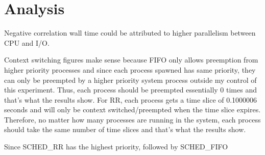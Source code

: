 ﻿\section{Analysis}

Negative correlation wall time could be attributed to higher parallelism between CPU and I/O.

Context switching figures make sense because FIFO only allows preemption from higher priority processes and since each process spawned has same priority, they can only be preempted by a higher priority system process outside my control of this experiment.  Thus, each process should be preempted essentially 0 times and that's what the results show.
For RR, each process gets a time slice of 0.1000006 seconds and will only be context switched/preempted when the time slice expires.  Therefore, no matter how many processes are running in the system, each process should take the same number of time slices and that's what the results show.

Since SCHED\_RR has the highest priority, followed by SCHED\_FIFO
